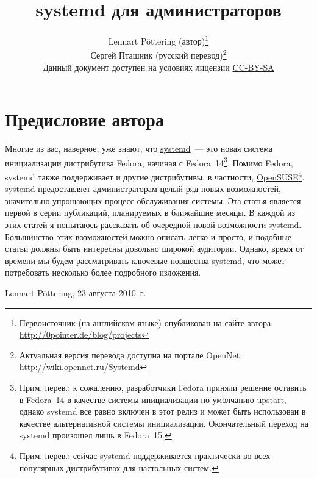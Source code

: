 \documentclass[10pt,oneside,a4paper]{article}
\newcommand{\sectiona}[1]{\section*{#1}\addcontentsline{toc}{section}{#1}}
\begin{document}
\sloppy
\title{systemd для администраторов}
\author{Lennart P\"{o}ttering (автор)\thanks{Первоисточник (на английском
языке) опубликован на сайте автора: \url{http://0pointer.de/blog/projects}}\\%
Сергей Пташник (русский перевод)\thanks{Актуальная версия перевода
доступна на портале OpenNet: \url{http://wiki.opennet.ru/Systemd}}\\%
\small Данный документ доступен на условиях лицензии
\href{http://creativecommons.org/licenses/by-sa/3.0/legalcode}{CC-BY-SA}}
\maketitle
\tableofcontents%
\sectiona{Предисловие автора}
Многие из вас, наверное, уже знают, что
\href{http://www.freedesktop.org/wiki/Software/systemd}{systemd}~--- это новая
система инициализации дистрибутива Fedora, начиная с Fedora~14\footnote{Прим.
перев.: к сожалению, разработчики Fedora приняли решение оставить в Fedora~14 в
качестве системы инициализации по умолчанию upstart, однако systemd все равно
включен в этот релиз и может быть использован в качестве альтернативной системы
инициализации. Окончательный переход на systemd произошел лишь в Fedora~15.}.
Помимо Fedora, systemd также поддерживает и другие дистрибутивы, в частности,
\href{http://en.opensuse.org/SDB:Systemd}{OpenSUSE}\footnote{Прим. перев.:
сейчас systemd поддерживается практически во всех популярных дистрибутивах для
настольных систем.}.  systemd предоставляет администраторам целый ряд новых
возможностей, значительно упрощающих процесс обслуживания системы. Эта статья
является первой в серии публикаций, планируемых в ближайшие месяцы. В каждой из
этих статей я попытаюсь рассказать об очередной новой возможности systemd.
Большинство этих возможностей можно описать легко и просто, и подобные статьи
должны быть интересны довольно широкой аудитории.  Однако, время от времени мы
будем рассматривать ключевые новшества systemd, что может потребовать несколько
более подробного изложения. 
\begin{flushright}
	Lennart P\"{o}ttering, 23 августа 2010~г.
\end{flushright}
\end{document}
